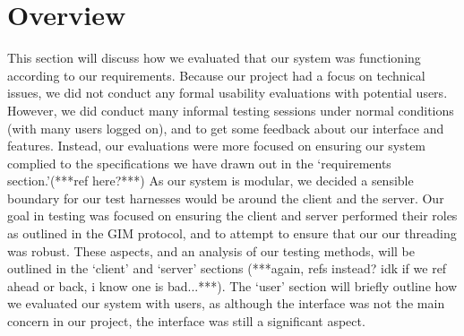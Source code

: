 \section{Overview}

This section will discuss how we evaluated that our system was functioning according to our requirements. Because our project had a focus on technical issues, we did not conduct any formal usability evaluations with potential users. However, we did conduct many informal testing sessions under normal conditions (with many users logged on), and to get some feedback about our interface and features. Instead, our evaluations were more focused on ensuring our system complied to the specifications we have drawn out in the `requirements section.'(***ref here?***) As our system is modular, we decided a sensible boundary for our test harnesses would be around the client and the server. Our goal in testing was focused on ensuring the client and server performed their roles as outlined in the GIM protocol, and to attempt to ensure that our our threading was robust.  These aspects, and an analysis of our testing methods, will be outlined in the `client' and `server' sections (***again, refs instead? idk if we ref ahead or back, i know one is bad...***). The `user' section will briefly outline how we evaluated our system with users, as although the interface was not the main concern in our project, the interface was still a significant aspect.

